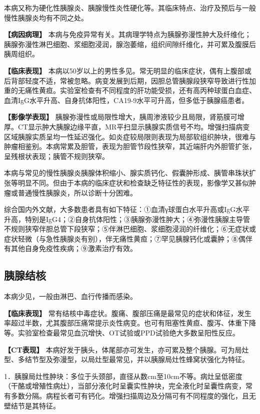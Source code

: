 本病又称为硬化性胰腺炎、胰腺慢性炎性硬化等。其临床特点、治疗及预后与一般慢性胰腺炎均有不同之处。

\textbf{【病因病理】}
本病与免疫异常有关。其病理学特点为胰腺弥漫性肿大及纤维化；胰腺弥漫性淋巴细胞、浆细胞浸润，腺泡萎缩，组织间隙纤维化，并可累及腹膜后胰周组织。

\textbf{【临床表现】}
本病以50岁以上的男性多见。常无明显的临床症状，偶有上腹部或后背部轻度不适，常被忽略。病变发展到后期，因胆总管胰腺段狭窄导致进行性加重的无痛性黄疸。实验室检查有不同程度的肝功能受损，还有高丙种球蛋白血症、血清IgG水平升高、自身抗体阳性，CA19-9水平可升高，但多低于胰腺癌患者。

\textbf{【影像学表现】}
胰腺弥漫性或局限性增大，胰周渗液较少且局限，肾筋膜可增厚。CT显示肿大胰腺边缘平直，MR平扫显示胰腺实质信号不均。增强扫描病变区域胰腺实质呈均一性延迟强化。如炎症较局限则表现为局部软组织肿块，很难与肿瘤相鉴别。本病常累及胆管，表现为胆管节段性狭窄，其近端肝内外胆管扩张，呈残根状表现；胰管不规则狭窄。

本病与常见的慢性胰腺炎胰腺体积缩小、腺实质钙化、假囊肿形成、胰管串珠状扩张等明显不同。但由于本病的临床症状和检查缺乏特征性的表现，影像学又甚似肿瘤或普通慢性胰腺炎，所以诊断十分困难。

综合国内外文献，大多数患者具有如下特征：①血清γ球蛋白水平升高或IgG水平升高，特别是IgG4；②自身抗体阳性；③胰腺弥漫性肿大；④弥漫性胰腺主导管不规则狭窄伴胆总管下段狭窄；⑤伴淋巴细胞、浆细胞浸润的纤维化；⑥无症状或症状轻微（与急性胰腺炎有别），伴无痛性黄疸；⑦罕见胰腺钙化或囊肿；⑧偶伴有其他自身免疫性疾病；⑨激素治疗有效。

\subsection{胰腺结核}

本病少见，一般由淋巴、血行传播而感染。

\textbf{【临床表现】}
常有结核中毒症状。腹痛、腹部压痛是最常见的症状和体征，发生率超过半数，尤其腹部压痛常提示炎性病变。也可有阻塞性黄疸、腹泻、体重下降等。实验室检查最常见血沉增快、OT试验或PPD试验绝大多数呈阳性反应。

\textbf{【CT表现】}
本病好发于胰头，体尾部亦可发生，亦可累及整个胰腺。可为局灶型、多结节型及弥漫型，以局灶型最常见，并以胰腺局灶性蜂窝状强化为特征。

1．胰腺局灶性肿块：多位于头颈部，直径从数cm至10cm不等。病灶呈低密度（干酪或增殖性病灶），当部分液化时呈囊实性肿块，完全液化时呈囊性病变，常有多数分隔。病程长者可有钙化。增强扫描周边及分隔可有不同程度的强化，且无壁结节是其特征。

